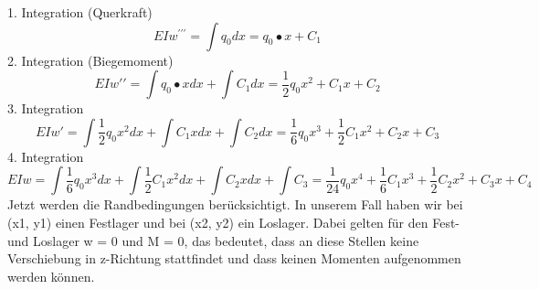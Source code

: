 1. Integration (Querkraft)
\begin{equation}
	EIw^{\prime\prime\prime}=
	\int q_0dx=
	q_0\bullet x+C_1
\end{equation}
2. Integration (Biegemoment)
\begin{equation}
	EIw\prime\prime=
	\int{q_0\bullet x}dx+\int C_1dx=
	\frac{1}{2}q_0x^2+C_1x+C_2
\end{equation}
3. Integration
\begin{equation}
	EIw\prime=
	\int{\frac{1}{2}q_0x^2}dx+\int{C_1x}dx+\int C_2dx=
	\frac{1}{6}q_0x^3+\frac{1}{2}C_1x^2+C_2x+C_3
\end{equation}
4. Integration
\begin{equation}
	EIw=
	\int{\frac{1}{6}q_0x^3}dx+\int{\frac{1}{2}C_1x^2}dx+\int{C_2x}dx+\int C_3=
	\frac{1}{24}q_0x^4+\frac{1}{6}C_1x^3+\frac{1}{2}C_2x^2+C_3x+C_4
\end{equation}
Jetzt werden die Randbedingungen berücksichtigt.
In unserem Fall haben wir bei (x1, y1) einen Festlager und bei (x2, y2) ein Loslager.
Dabei gelten für den Fest- und Loslager w = 0 und M = 0, das bedeutet, dass an diese Stellen keine Verschiebung in z-Richtung stattfindet und dass keinen Momenten aufgenommen werden können.

